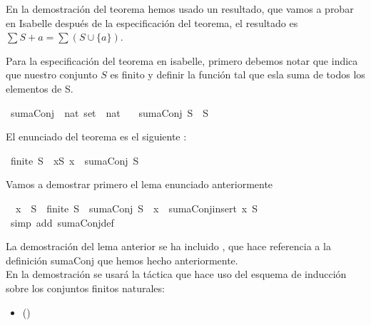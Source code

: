 \begin{isabellebody}
\begin{isamarkuptext}
En la demostración del teorema hemos usado un resultado, que vamos a
 probar en Isabelle después de la especificación del teorema,
 el resultado es $\sum S + a = \sum (S \cup \{ a
 \})$.%
\end{isamarkuptext}\isamarkuptrue%
%
\begin{isamarkuptext}%
Para la especificación del teorema en isabelle, primero debemos
 notar que   indica que nuestro conjunto $S$ es 
finito  y definir  la función  tal que
  esla suma de todos los elementos de S.%
\end{isamarkuptext}\isamarkuptrue%
\isamarkupfalse%
\ sumaConj\ {\isacharcolon}{\isacharcolon}\ {\isachardoublequoteopen}nat\ set\ {\isasymRightarrow}\ nat{\isachardoublequoteclose}\ \isanewline
\ \ {\isachardoublequoteopen}sumaConj\ S\ {\isasymequiv}\ {\isasymSum}S{\isachardoublequoteclose}%
\begin{isamarkuptext}%
El enunciado del teorema es el siguiente :%
\end{isamarkuptext}\isamarkuptrue%
\isamarkupfalse%
\ {\isachardoublequoteopen}finite\ S\ {\isasymLongrightarrow}\ {\isasymforall}x{\isasymin}S{\isachardot}\ x\ {\isasymle}\ sumaConj\ S{\isachardoublequoteclose}\isanewline
%
\isadelimproof
\isanewline
\ \ %
\endisadelimproof
%
\isatagproof
{}\isamarkupfalse%
%
\endisatagproof
{\isafoldproof}%
%
\isadelimproof
%
\endisadelimproof
%
\begin{isamarkuptext}%
Vamos a demostrar primero el lema enunciado anteriormente%
\end{isamarkuptext}\isamarkuptrue%
\isamarkupfalse%
\ {\isachardoublequoteopen}\ x\ {\isasymnotin}\ S\ {\isasymand}\ finite\ S\ {\isasymlongrightarrow}\ sumaConj\ S\ {\isacharplus}\ x\ {\isacharequal}\ sumaConj{\isacharparenleft}insert\ x\ S{\isacharparenright}{\isachardoublequoteclose}\isanewline
%
\isadelimproof
\ \ %
\endisadelimproof
%
\isatagproof
{}\isamarkupfalse%
\ {\isacharparenleft}simp\ add{\isacharcolon}\ sumaConj{\isacharunderscore}def{\isacharparenright}%
\endisatagproof
{\isafoldproof}%
%
\isadelimproof
%
\endisadelimproof
%
\begin{isamarkuptext}%
La demostración del lema anterior se ha incluido
 , que hace referencia a la definición sumaConj que
 hemos hecho anteriormente. \\
En la demostración se usará la táctica  que hace
  uso del esquema de inducción sobre los conjuntos finitos naturales:
  \begin{itemize}
  \item[]  \hfill ()
  \end{itemize} 


\end{isamarkuptext}
\end{isabellebody}
